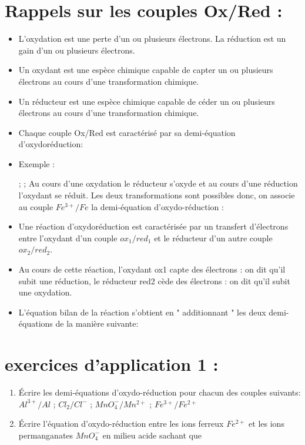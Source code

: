 \documentclass[12pt]{article}
\begin{document}
\section{Rappels sur les couples Ox/Red : }
\begin{itemize}
	\item L'oxydation est une perte d'un ou plusieurs électrons. La réduction est un gain d'un ou plusieurs électrons.
	\item  Un oxydant est une espèce chimique capable de capter un ou plusieurs électrons au cours d'une transformation chimique.
	\item Un réducteur est une espèce chimique capable de céder un ou plusieurs électrons au cours d'une transformation chimique.
	\item Chaque couple Ox/Red est caractérisé par sa demi-équation d'oxydoréduction: 
	\item Exemple : 

		 ; 
		\hspace{5cm}	 ;
Au cours d'une oxydation le réducteur s'oxyde et au cours d'une réduction l'oxydant se réduit.
Les deux transformations sont possibles donc, on associe au couple $Fe^{3+}/Fe$ la demi-équation d'oxydo-réduction :

\item Une réaction d'oxydoréduction est caractérisée par un transfert d'électrons entre l'oxydant d'un couple $ox_1/red_1$ et le
réducteur d'un autre couple $ox_2/red_2$.
\item Au cours de cette réaction, l'oxydant ox1 capte des électrons : on dit qu'il subit une réduction, le réducteur red2 cède des
électrons : on dit qu'il subit une oxydation.
\item L'équation bilan de la réaction s'obtient en " additionnant " les deux demi-équations de la manière suivante: 

\end{itemize}
\section*{exercices d'application 1  : }
\begin{enumerate}
	\item Écrire les demi-équations d'oxydo-réduction pour chacun des couples suivants: $Al^{3+}/Al$ ; $Cl_2/Cl^-$ ; $MnO_4^-/Mn^{2+}$ ; $Fe^{3+}/Fe^{2+}$
	\item Écrire l'équation d'oxydo-réduction entre les ions ferreux $Fe^{2+}$ et les ions permanganates $MnO_4^-$ en milieu acide sachant que  
\end{enumerate}
\end{document}
